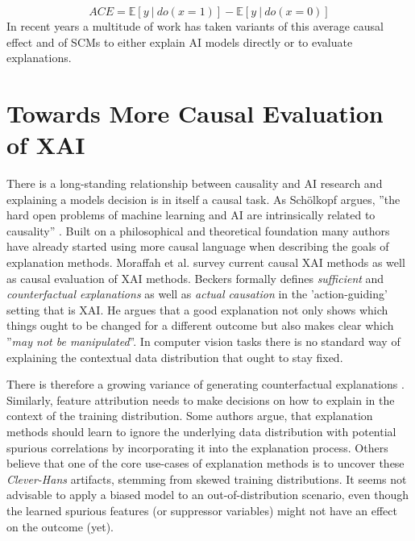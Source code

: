 \begin{equation}
\displaystyle ACE = \mathbb{E} [ y \ | \ do(x=1) ] - \mathbb{E} [ y \ | \ do(x=0) ] 
\end{equation}
In recent years a multitude of work has taken variants of this average causal effect and of SCMs to either explain AI models directly or to evaluate explanations. 

\section{Towards More Causal Evaluation of XAI}\label{section:causal_xai}

There is a long-standing relationship between causality and AI research and explaining a models decision is in itself a causal task.
As Schölkopf argues, ''the hard open problems of machine learning and AI are intrinsically related to causality'' \cite{Schoelkopf2019}.
Built on a philosophical and theoretical foundation \cite{Woodward2004, Halpern2005, Schoelkopf2019} many authors have already started using more causal language when describing the goals of explanation methods. Moraffah et al. \cite{Moraffah2020a} survey current causal XAI methods as well as causal evaluation of XAI methods. Beckers \cite{Beckers2022} formally defines \textit{sufficient} and \textit{counterfactual explanations} as well as \textit{actual causation} in the 'action-guiding' setting that is XAI. He argues that a good explanation not only shows which things ought to be changed for a different outcome but also makes clear which ''\textit{may not be manipulated}''. In computer vision tasks there is no standard way of explaining the contextual data distribution that ought to stay fixed. 

There is therefore a growing variance of generating counterfactual explanations \cite{Moraffah2020a}. Similarly, feature attribution needs to make decisions on how to explain in the context of the training distribution. 
Some authors \cite{Kindermans2017,Wilming2023, Wilming2022} argue, that explanation methods should learn to ignore the underlying data distribution with potential spurious correlations by incorporating it into the explanation process. Others believe that one of the core use-cases of explanation methods is to uncover these \textit{Clever-Hans} artifacts, stemming from skewed training distributions. It seems not advisable to apply a biased model to an out-of-distribution scenario, even though the learned spurious features (or suppressor variables) might not have an effect on the outcome (yet).\\

